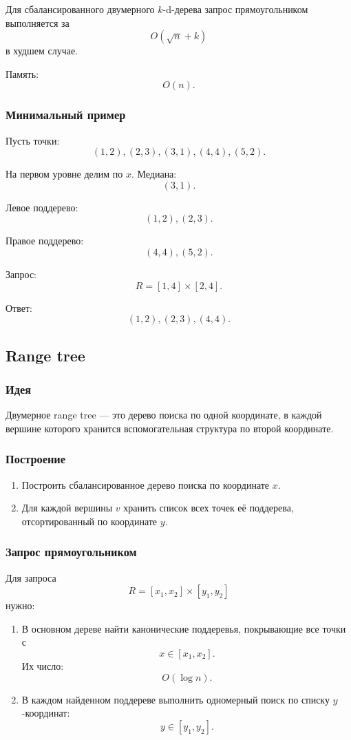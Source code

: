 \documentclass[12pt,a4paper]{article}
\begin{document}
Для сбалансированного двумерного \(k\)-d-дерева запрос прямоугольником выполняется за
\[
O(\sqrt n+k)
\]
в худшем случае.

Память:
\[
O(n).
\]

\subsubsection{Минимальный пример}

Пусть точки:
\[
(1,2),(2,3),(3,1),(4,4),(5,2).
\]

На первом уровне делим по \(x\). Медиана:
\[
(3,1).
\]

Левое поддерево:
\[
(1,2),(2,3).
\]

Правое поддерево:
\[
(4,4),(5,2).
\]

Запрос:
\[
R=[1,4]\times[2,4].
\]

Ответ:
\[
(1,2),(2,3),(4,4).
\]

\subsection{Range tree}

\subsubsection{Идея}

Двумерное range tree — это дерево поиска по одной координате, в каждой вершине которого хранится вспомогательная структура по второй координате.

\subsubsection{Построение}

\begin{enumerate}
    \item Построить сбалансированное дерево поиска по координате \(x\).
    \item Для каждой вершины \(v\) хранить список всех точек её поддерева, отсортированный по координате \(y\).
\end{enumerate}

\subsubsection{Запрос прямоугольником}

Для запроса
\[
R=[x_1,x_2]\times[y_1,y_2]
\]
нужно:

\begin{enumerate}
    \item В основном дереве найти канонические поддеревья, покрывающие все точки с
    \[
    x\in[x_1,x_2].
    \]
    Их число:
    \[
    O(\log n).
    \]
    \item В каждом найденном поддереве выполнить одномерный поиск по списку \(y\)-координат:
    \[
    y\in[y_1,y_2].
    \]
\end{enumerate}
\end{document}

